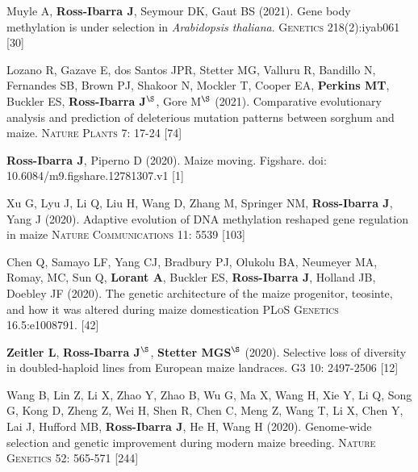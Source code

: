 \documentclass[letterpaper,10pt]{article}
\begin{document}
\begin{etaremune}
\item Muyle A, \textbf{Ross-Ibarra J}, Seymour DK, Gaut BS (2021). Gene body methylation is under selection in \textit{Arabidopsis thaliana}. \textsc{Genetics} 218(2):iyab061 %
 [30]\\

\item Lozano R, Gazave E, dos Santos JPR, Stetter MG, Valluru R, Bandillo N, Fernandes SB, Brown PJ, Shakoor N, Mockler T, Cooper EA, \textbf{Perkins MT}, Buckler ES, \textbf{Ross-Ibarra J}$^\S$, Gore M$^\S$ (2021). Comparative evolutionary analysis and prediction of deleterious mutation patterns between sorghum and maize. \textsc{Nature Plants} 7: 17-24  %
 [74]\\

\item \textbf{Ross-Ibarra J}, Piperno D (2020). Maize moving. Figshare. doi: 10.6084/m9.figshare.12781307.v1 [1] 
\newline

\item Xu G, Lyu J, Li Q, Liu H, Wang D, Zhang M, Springer NM, \textbf{Ross-Ibarra J}, Yang J (2020). Adaptive evolution of DNA methylation reshaped gene regulation in maize \textsc{Nature Communications} 11: 5539
 [103]\\

\item Chen Q, Samayo LF, Yang CJ, Bradbury PJ, Olukolu BA, Neumeyer MA, Romay, MC, Sun Q, \textbf{Lorant A}, Buckler ES, \textbf{Ross-Ibarra J}, Holland JB, Doebley JF (2020).
The genetic architecture of the maize progenitor, teosinte, and how it was altered during maize domestication \textsc{PLoS Genetics} 16.5:e1008791.
 [42]\\

\item \textbf{Zeitler L}, \textbf{Ross-Ibarra J}$^\S$, \textbf{Stetter MGS}$^\S$ (2020). Selective loss of diversity in doubled-haploid lines from European maize landraces. \textsc{G3} 10: 2497-2506
 [12]\\

\item Wang B, Lin Z, Li X, Zhao Y, Zhao B, Wu G, Ma X, Wang H, Xie Y, Li Q, Song G, Kong D, Zheng Z, Wei H, Shen R, Chen C, Meng Z, Wang T, Li X, Chen Y, Lai J, Hufford MB, \textbf{Ross-Ibarra J}, He H, Wang H (2020). Genome-wide selection and genetic improvement during modern maize breeding. \textsc{Nature Genetics} 52: 565-571
 [244]\\


\end{etaremune}
\end{document}
